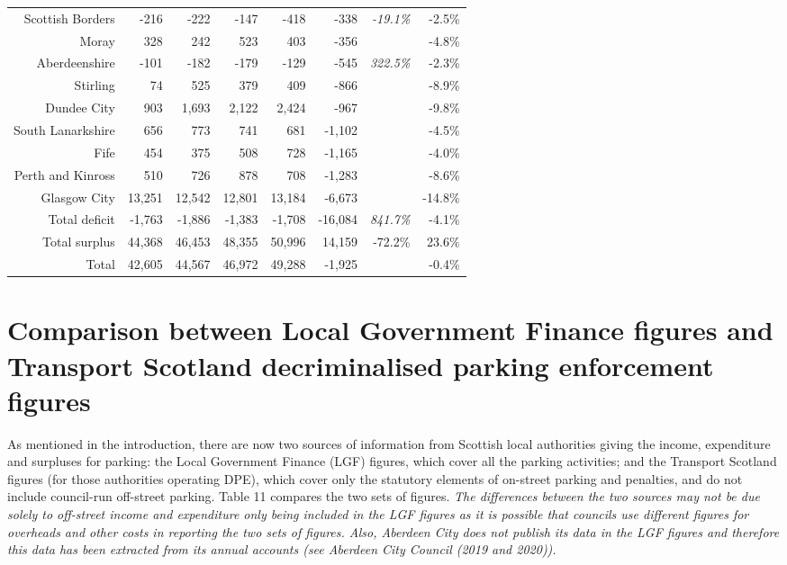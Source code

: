 \documentclass[
  12pt,
]{article}
\begin{document}
\begin{longtable}[t]{rrrrrrrr}
Scottish Borders & -216 & -222 & -147 & -418 & -338 & \em{-19.1\%} & -2.5\%\\
Moray & 328 & 242 & 523 & 403 & -356 &  & -4.8\%\\
Aberdeenshire & -101 & -182 & -179 & -129 & -545 & \em{322.5\%} & -2.3\%\\
Stirling & 74 & 525 & 379 & 409 & -866 &  & -8.9\%\\
Dundee City & 903 & 1,693 & 2,122 & 2,424 & -967 &  & -9.8\%\\
South Lanarkshire & 656 & 773 & 741 & 681 & -1,102 &  & -4.5\%\\
Fife & 454 & 375 & 508 & 728 & -1,165 &  & -4.0\%\\
Perth and Kinross & 510 & 726 & 878 & 708 & -1,283 &  & -8.6\%\\
Glasgow City & 13,251 & 12,542 & 12,801 & 13,184 & -6,673 &  & -14.8\%\\
\midrule
Total deficit & -1,763 & -1,886 & -1,383 & -1,708 & -16,084 & \em{841.7\%} & -4.1\%\\
Total surplus & 44,368 & 46,453 & 48,355 & 50,996 & 14,159 & -72.2\% & 23.6\%\\
\midrule
Total & 42,605 & 44,567 & 46,972 & 49,288 & -1,925 &  & -0.4\%\\*
\end{longtable}
\endgroup{}

\newpage

\hypertarget{comparison-between-local-government-finance-figures-and-transport-scotland-decriminalised-parking-enforcement-figures}{%
\section{Comparison between Local Government Finance figures and Transport Scotland decriminalised parking enforcement figures}\label{comparison-between-local-government-finance-figures-and-transport-scotland-decriminalised-parking-enforcement-figures}}

As mentioned in the introduction, there are now two sources of information from Scottish local authorities giving the income, expenditure and surpluses for parking: the Local Government Finance (LGF) figures, which cover all the parking activities; and the Transport Scotland figures (for those authorities operating DPE), which cover only the statutory elements of on-street parking and penalties, and do not include council-run off-street parking. Table 11 compares the two sets of figures. \emph{The differences between the two sources may not be due solely to off-street income and expenditure only being included in the LGF figures as it is possible that councils use different figures for overheads and other costs in reporting the two sets of figures. Also, Aberdeen City does not publish its data in the LGF figures and therefore this data has been extracted from its annual accounts (see Aberdeen City Council (2019 and 2020)).}
\end{document}
